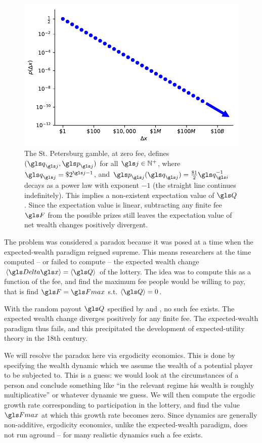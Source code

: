 \begin{figure}
\includegraphics[width=.5\textwidth]{./chapter_real/figs/SP_power_law.pdf}  %
\caption{The St. Petersburg gamble, at zero fee, defines $(\q_\gj,\p_\gj)$ for all $\gj\in \mathbb{N}^+$, where 
$\q_\gj=\$2^{\gj-1}$, and $\p_\gj(\q_\gj)=\frac{\$1}{2}\q_\gi^{-1}$ decays as a power law with 
exponent $-1$ (the straight line continues indefinitely). This implies a non-existent expectation 
value of $\Q$. Since the expectation value is linear, subtracting any finite fee $\F$ from the possible
prizes still leaves the expectation value of net wealth changes positively divergent.}
\end{figure}

The problem was considered a paradox because it was posed at a time when the 
expected-wealth paradigm reigned supreme. This means researchers at the time
computed -- or failed to compute -- the expected wealth change $\ave{\D\x}=\ave{\Q}$ 
of the lottery. 
The idea was to compute this as a function of the fee, and find the maximum 
fee people would be willing to pay, that is find 
$\F=\Fmax$ s.t. $\ave{\Q}=0$.

With the random payout $\Q$ specified by  and , no such fee exists.
The expected wealth change diverges positively for any finite fee. The expected-wealth 
paradigm thus fails, and this precipitated the development of expected-utility theory
in the 18th century.

We will resolve the paradox here via ergodicity 
economics. This is done by specifying the wealth dynamic which we assume the wealth
of a potential player to be subjected to. This is a guess: we would look at the circumstances
of a person and conclude something like ``in the relevant regime his wealth is 
roughly multiplicative'' or whatever dynamic we guess. 
We will then compute the ergodic growth rate corresponding to participation in the lottery, 
and find the value $\Fmax$ at which
this growth rate becomes zero. Since dynamics are generally non-additive, ergodicity 
economics, unlike the expected-wealth paradigm,
does not run aground -- for many realistic dynamics such a fee exists.

